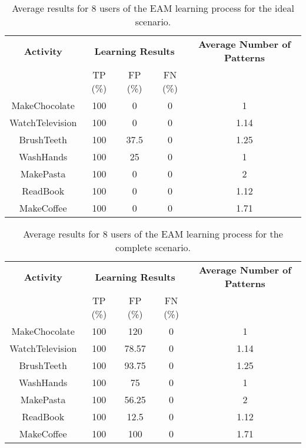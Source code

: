         
\begin{table}[htbp]\scriptsize
  \begin{center}
        \begin{tabular}{ccccc}
            \hline            
            \textbf{Activity} & \multicolumn{3}{c}{\textbf{Learning Results}} & \textbf{Average Number of Patterns} \\
             & TP (\%) & FP (\%) & FN (\%) & \\             
            \hline
            MakeChocolate   & 100 & 0     & 0  & 1 \\
	    WatchTelevision & 100 & 0     & 0  & 1.14    \\
	    BrushTeeth      & 100 & 37.5  & 0  & 1.25 \\
	    WashHands       & 100 & 25    & 0  & 1 \\
	    MakePasta       & 100 & 0     & 0  & 2 \\
	    ReadBook        & 100 & 0     & 0  & 1.12  \\
	    MakeCoffee      & 100 & 0     & 0  & 1.71  \\
            \hline
        \end{tabular}
        \caption{Average results for 8 users of the EAM learning process for the ideal scenario.}
        \label{tab-rp-ideal-t2}
    \end{center}
\end{table}
\begin{table}[htbp]\scriptsize
  \begin{center}
        \begin{tabular}{ccccc}
            \hline            
            \textbf{Activity} & \multicolumn{3}{c}{\textbf{Learning Results}} & \textbf{Average Number of Patterns} \\
             & TP (\%) & FP (\%) & FN (\%) & \\             
            \hline
            MakeChocolate   & 100 & 120   & 0 & 1 \\
	    WatchTelevision & 100 & 78.57 & 0 & 1.14 \\
	    BrushTeeth      & 100 & 93.75 & 0 & 1.25 \\
	    WashHands       & 100 & 75    & 0 & 1 \\
	    MakePasta       & 100 & 56.25 & 0 & 2 \\
	    ReadBook        & 100 & 12.5  & 0 & 1.12 \\
	    MakeCoffee      & 100 & 100   & 0 & 1.71 \\
            \hline
        \end{tabular}                
        \caption{Average results for 8 users of the EAM learning process for the complete scenario.}
        \label{tab-rp-comp-t2}
    \end{center}
\end{table}

